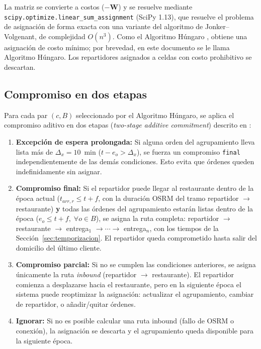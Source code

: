 \documentclass[12pt,letterpaper,oneside]{book}
\begin{document}
	La matriz se convierte a costos ($-\mathbf{W}$) y se resuelve mediante
	\texttt{scipy.optimize.linear\_sum\_assignment} (SciPy 1.13), que resuelve el problema de
	asignación de forma exacta con una variante del algoritmo de Jonker--Volgenant, de complejidad
	$O(n^3)$.  Como el Algoritmo Húngaro \citep{Kuhn1955}, obtiene una asignación de costo mínimo;
	por brevedad, en este documento se le llama Algoritmo Húngaro.  Los repartidores asignados a celdas con costo prohibitivo se descartan.

	\subsection{Compromiso en dos etapas}

	Para cada par $(c, B)$ seleccionado por el Algoritmo Húngaro, se aplica el
	compromiso aditivo en dos etapas (\textit{two-stage additive commitment})
	descrito en \citet{Reyes2018}:

	\begin{enumerate}
		\item \textbf{Excepción de espera prolongada:} Si alguna orden del agrupamiento lleva 
		lista más de $\Delta_x = 10$~min ($t - e_o > \Delta_x$), se fuerza un compromiso 
		\texttt{final} independientemente de las demás condiciones. Esto evita que órdenes 
		queden indefinidamente sin asignar.

		\item \textbf{Compromiso final:} Si el repartidor puede llegar al restaurante dentro de 
		la época actual ($t_{arr,r} \leq t + f$, con la duración OSRM del tramo
		repartidor $\to$ restaurante) \textbf{y} todas las órdenes del 
		agrupamiento estarán listas dentro de la época ($e_o \leq t + f, \;\forall o \in B$), se asigna la ruta completa: 
		repartidor $\to$ restaurante $\to$ entrega$_1$ $\to \cdots \to$ entrega$_n$, con los
		tiempos de la Sección~\ref{sec:temporizacion}. El repartidor queda comprometido hasta
		salir del domicilio del último cliente.

		\item \textbf{Compromiso parcial:} Si no se cumplen las condiciones anteriores, se
		asigna únicamente la ruta \textit{inbound} (repartidor $\to$ restaurante). El repartidor 
		comienza a desplazarse hacia el restaurante, pero en la siguiente época el sistema 
		puede reoptimizar la asignación: actualizar el agrupamiento, cambiar de repartidor, o 
		añadir/quitar órdenes.

		\item \textbf{Ignorar:} Si no es posible calcular una ruta inbound 
		(fallo de OSRM o conexión), la asignación se descarta y el agrupamiento queda 
		disponible para la siguiente época.
	\end{enumerate}
\end{document}
